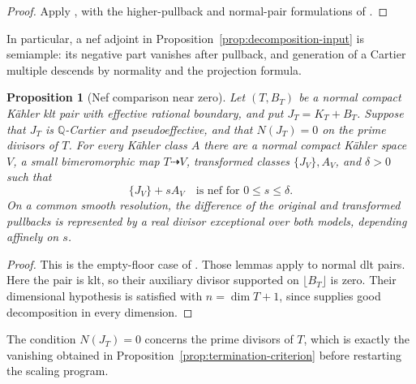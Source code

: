 \documentclass[11pt,a4paper]{article}
\numberwithin{equation}{section}
\newtheorem{proposition}[theorem]{Proposition}
\theoremstyle{definition}
\theoremstyle{remark}
\begin{document}
\begin{proof}
Apply \cite[Theorem~2.13]{OAI034}, with the higher-pullback and
normal-pair formulations of \cite[Lemma~2.4 and Proposition~2.7]{OAI034}.
\end{proof}

In particular, a nef adjoint in Proposition~\ref{prop:decomposition-input}
is semiample: its negative part vanishes after pullback, and generation
of a Cartier multiple descends by normality and the projection formula.

\begin{proposition}[Nef comparison near zero]
\label{prop:interval-input}\label{in:interval}
Let $(T,B_T)$ be a normal compact Kähler klt pair with effective
rational boundary, and put $J_T=K_T+B_T$. Suppose that $J_T$ is
$\mathbb Q$-Cartier and pseudoeffective, and that $N(J_T)=0$ on
the prime divisors of $T$. For every Kähler class $A$ there are
a normal compact Kähler space $V$, a small bimeromorphic map
$T\dashrightarrow V$, transformed classes $\{J_V\},A_V$, and
$\delta>0$ such that
\[
 \{J_V\}+sA_V\quad\text{is nef for }0\le s\le\delta.
\]
On a common smooth resolution, the difference of the original and
transformed pullbacks is represented by a real divisor exceptional
over both models, depending affinely on $s$.
\end{proposition}

\begin{proof}
This is the empty-floor case of
\cite[Lemmas~3.11--3.12]{OAI034}. Those lemmas apply to normal dlt pairs. Here the pair is klt,
so their auxiliary divisor supported on $\lfloor B_T\rfloor$
is zero.
Their dimensional hypothesis is satisfied with
$n=\dim T+1$, since \cite[Theorem~2.13]{OAI034} supplies good
decomposition in every dimension.
\end{proof}

The condition $N(J_T)=0$ concerns the prime divisors of $T$,
which is exactly the vanishing obtained in
Proposition~\ref{prop:termination-criterion} before restarting
the scaling program.
\end{document}
